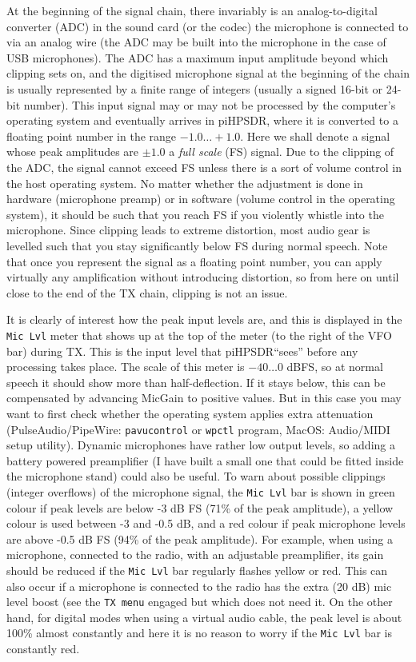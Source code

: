 \documentclass[12pt]{book}
\def\bltt#1{\texttt{\color{blue}#1}}
\def\pH{pi\-HPSDR\xspace}
\begin{document}
At the beginning of the signal chain, there invariably is an analog-to-digital converter (ADC)
in the sound card (or the codec) the microphone is connected to via an analog wire (the ADC may
be built into the microphone in the case of USB microphones). The ADC has a maximum input amplitude
beyond which clipping sets on, and the digitised microphone signal at the beginning of the chain
is usually represented by a finite range of integers (usually a signed 16-bit or 24-bit number). This input signal
may or may not be processed by the computer's operating system and eventually arrives in \pH, where it
is converted to a floating point number in the range $-1.0\ldots+1.0$. Here we shall denote a signal
whose peak amplitudes are $\pm 1.0$ a \textit{full scale} (FS) signal. Due to the clipping of the ADC,
the signal cannot exceed FS unless there is a sort of volume control in the host operating system.
No matter whether the adjustment is done in hardware (microphone preamp) or in software (volume control
in the operating system),
it should be such that you reach FS if you violently
whistle into the microphone. Since clipping leads to extreme distortion, most audio
gear is levelled such that you stay significantly below FS during normal speech. Note that once you
represent the signal as a floating point number, you can apply virtually any amplification without
introducing distortion, so from here on until close to the end of the TX chain, clipping is not an issue.

It is clearly of interest how the peak input levels are, and this is displayed in the \texttt{Mic Lvl}
meter that shows up at the top of the meter (to the right of the VFO bar) during TX. This is the input
level that \pH ``sees'' before any processing takes place. The scale of this meter is $-40\ldots 0$ dBFS,
so at normal speech it should show more than half-deflection. If it stays below, this can be
compensated by advancing MicGain to positive values. But in this case you may want to first check
whether  the operating system applies extra attenuation (PulseAudio/PipeWire: \texttt{pavucontrol}
or \texttt{wpctl} program,
 MacOS: Audio/MIDI setup utility). Dynamic microphones have rather low  output levels, so
adding a battery powered preamplifier (I have built a small one that could be fitted inside
the microphone stand) could also be useful. To warn about possible clippings (integer overflows) of the
microphone signal, the \texttt{Mic Lvl} bar
is shown in green colour if peak levels are below -3 dB FS (71\% of the peak amplitude), a yellow colour is used
between -3 and -0.5 dB,  and a red colour if peak microphone levels are above -0.5 dB FS (94\% of the peak amplitude).
 For example, when using a microphone, connected to the radio, with an adjustable preamplifier,
its gain should be reduced if the \texttt{Mic Lvl} bar regularly flashes yellow or red.
This can also occur if a microphone is connected to the radio has the extra (20 dB)
mic level boost (see the \bltt{TX menu} engaged but which does not need it.
On the other hand,
for digital modes when using a virtual audio cable, the peak level is about 100\% almost constantly
and here it is no reason to worry if the \texttt{Mic Lvl} bar is constantly red.
\end{document}
